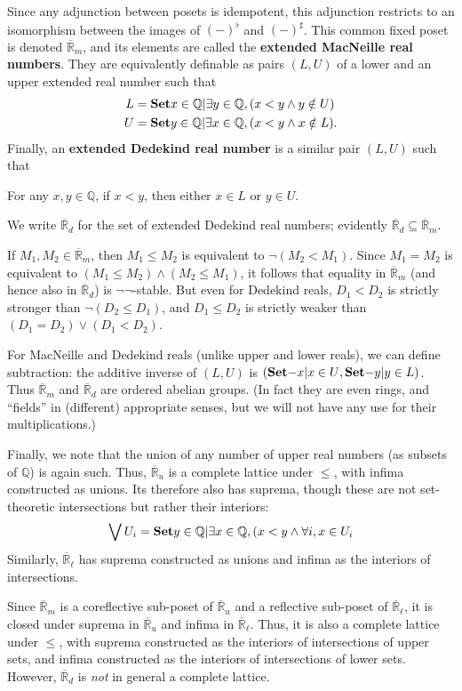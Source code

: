 \documentclass{article}
\def\Q{\mathbb{Q}}
\def\R{\mathbb{R}}
\def\Re{\overline{\R}}
\def\Red{\Re_d}
\def\Rem{\Re_m}
\def\Reu{\Re_u}
\def\Rel{\Re_{\ell}}
\def\upp#1{{#1}^{\sharp}}
\def\low#1{{#1}^{\flat}}
\def\nn{\ensuremath{\neg\neg}}
\begin{document}
Since any adjunction between posets is idempotent, this adjunction restricts to an isomorphism between the images of $\low{(-)}$ and $\upp{(-)}$.
This common fixed poset is denoted $\Rem$, and its elements are called the \textbf{extended MacNeille real numbers}.
They are equivalently definable as pairs $(L,U)$ of a lower and an upper extended real number such that
\begin{align*}
 L &= \setof{x\in\Q | \exists y\in \Q, (x<y \land y\notin U)}\\
 U &= \setof{y\in\Q | \exists x\in \Q, (x<y \land x\notin L)}.
\end{align*}
Finally, an \textbf{extended Dedekind real number} is a similar pair $(L,U)$ such that
\begin{center}
  For any $x,y\in\Q$, if $x<y$, then either $x\in L$ or $y\in U$.
\end{center}
We write $\Red$ for the set of extended Dedekind real numbers; evidently $\Red \subseteq \Rem$.

If $M_1,M_2\in\Rem$, then $M_1 \le M_2$ is equivalent to $\neg(M_2<M_1)$.
Since $M_1=M_2$ is equivalent to $(M_1 \le M_2) \land (M_2 \le M_1)$, it follows that equality in $\Rem$ (and hence also in $\Red$) is \nn-stable.
But even for Dedekind reals, $D_1<D_2$ is strictly stronger than $\neg(D_2 \le D_1)$, and $D_1\le D_2$ is strictly weaker than $(D_1=D_2) \lor (D_1 < D_2)$.

For MacNeille and Dedekind reals (unlike upper and lower reals), we can define subtraction: the additive inverse of $(L,U)$ is $( \setof{-x | x\in U}, \setof{-y | y\in L})$.
Thus $\Rem$ and $\Red$ are ordered abelian groups.
(In fact they are even rings, and ``fields'' in (different) appropriate senses, but we will not have any use for their multiplications.)

Finally, we note that the union of any number of upper real numbers (as subsets of $\Q$) is again such.
Thus, $\Reu$ is a complete lattice under $\le$, with infima constructed as unions.
Its therefore also has suprema, though these are not set-theoretic intersections but rather their interiors:
\[ \bigvee U_i = \setof{ y\in\Q | \exists x\in\Q, (x<y \land \forall i, x\in U_i}\]
Similarly, $\Rel$ has suprema constructed as unions and infima as the interiors of intersections.

Since $\Rem$ is a coreflective sub-poset of $\Reu$ and a reflective sub-poset of $\Rel$, it is closed under suprema in $\Reu$ and infima in $\Rel$.
Thus, it is also a complete lattice under $\le$, with suprema constructed as the interiors of intersections of upper sets, and infima constructed as the interiors of intersections of lower sets.
However, $\Red$ is \emph{not} in general a complete lattice.
\end{document}
